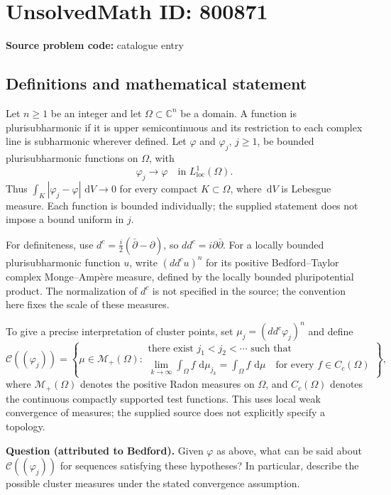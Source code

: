 \documentclass[11pt]{article}
\newcommand{\C}{\mathbb{C}}
\newcommand{\dd}{\,\mathrm{d}}
\begin{document}
\section*{UnsolvedMath ID: 800871}
\textbf{Source problem code:} catalogue entry
\subsection{Definitions and mathematical statement}
Let \(n\geq 1\) be an integer and let \(\Omega\subset\C^n\) be a domain. A function is plurisubharmonic if it is upper semicontinuous and its restriction to each complex line is subharmonic wherever defined. Let \(\varphi\) and \(\varphi_j\), \(j\geq 1\), be bounded plurisubharmonic functions on \(\Omega\), with
\[
\varphi_j\longrightarrow\varphi\quad\text{in }L^1_{\mathrm{loc}}(\Omega).
\]
Thus \(\int_K|\varphi_j-\varphi|\,\dd V\to0\) for every compact \(K\subset\Omega\), where \(\dd V\) is Lebesgue measure. Each function is bounded individually; the supplied statement does not impose a bound uniform in \(j\).

For definiteness, use \(d^c=\frac{i}{2}(\bar\partial-\partial)\), so \(dd^c=i\partial\bar\partial\). For a locally bounded plurisubharmonic function \(u\), write \((dd^c u)^n\) for its positive Bedford--Taylor complex Monge--Amp\`ere measure, defined by the locally bounded pluripotential product. The normalization of \(d^c\) is not specified in the source; the convention here fixes the scale of these measures.

To give a precise interpretation of cluster points, set \(\mu_j=(dd^c\varphi_j)^n\) and define
\[
\mathcal C((\varphi_j))=
\left\{\mu\in\mathcal M_+(\Omega):
\begin{array}{l}
\text{there exist }j_1<j_2<\cdots\text{ such that}\\
\displaystyle\lim_{k\to\infty}\int_\Omega f\,\dd\mu_{j_k}
=\int_\Omega f\,\dd\mu
\quad\text{for every }f\in C_c(\Omega)
\end{array}\right\},
\]
where \(\mathcal M_+(\Omega)\) denotes the positive Radon measures on \(\Omega\), and \(C_c(\Omega)\) denotes the continuous compactly supported test functions. This uses local weak convergence of measures; the supplied source does not explicitly specify a topology.

\textbf{Question (attributed to Bedford).} Given \(\varphi\) as above, what can be said about \(\mathcal C((\varphi_j))\) for sequences satisfying these hypotheses? In particular, describe the possible cluster measures under the stated convergence assumption.
\end{document}
